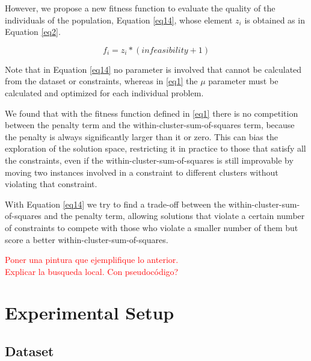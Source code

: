 \documentclass[review]{elsarticle}
\begin{document}
However, we propose a new fitness function to evaluate the quality of the individuals of the population, Equation \eqref{eq14}, whose element $z_i$ is obtained as in Equation \eqref{eq2}.

\begin{equation}
f_i = z_i * (infeasibility + 1)
\label{eq14}
\end{equation}

Note that in Equation \eqref{eq14} no parameter is involved that cannot be calculated from the dataset or constraints, whereas in \eqref{eq1} the $\mu$ parameter must be calculated and optimized for each individual problem.

We found that with the fitness function defined in \eqref{eq1} there is no competition between the penalty term and the within-cluster-sum-of-squares term, because the penalty is always significantly larger than it or zero. This can bias the exploration of the solution space, restricting it in practice to those that satisfy all the constraints, even if the within-cluster-sum-of-squares is still improvable by moving two instances involved in a constraint to different clusters without violating that constraint.

With Equation \eqref{eq14} we try to find a trade-off between the within-cluster-sum-of-squares and the penalty term, allowing solutions that violate a certain number of constraints to compete with those who violate a smaller number of them but score a better within-cluster-sum-of-squares.

\textcolor{red}{Poner una pintura que ejemplifique lo anterior.}\\
\textcolor{red}{Explicar la busqueda local. Con pseudocódigo?}

\clearpage

\section{Experimental Setup}

\subsection{Dataset}
\end{document}
